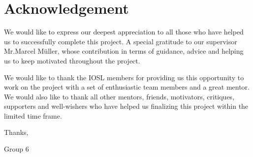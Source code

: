 \chapter*{Acknowledgement}
\label{cha:acknowledgments}
\vspace{20 mm}

We would like to express our deepest appreciation to all those who have helped us to successfully complete this project. A special gratitude to our supervisor Mr.Marcel Müller, whose contribution in terms of guidance, advice and helping us to keep motivated throughout the project. 


We would like to thank the IOSL members for providing us this opportunity to work on the project with a set of enthusiastic team members and a great mentor. We would also like to thank all other mentors, friends, motivators, critiques, supporters and well-wishers who have helped us finalizing this project within the limited time frame. 

\vspace{20 mm}
\noindent Thanks, 
\vspace{2 mm}

\noindent Group 6


